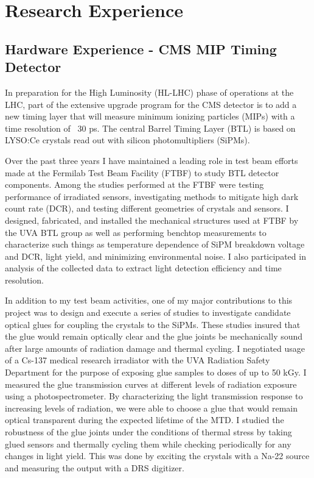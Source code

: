 \documentclass[a4paper]{article}
\begin{document}
\section{Research Experience}



\subsection{Hardware Experience - CMS MIP Timing Detector}
In preparation for the High Luminosity (HL-LHC) phase of operations at the LHC, part of the extensive upgrade program for the CMS detector is to add a new timing layer that will measure minimum ionizing particles (MIPs) with a time resolution of ~30 ps.  The central Barrel Timing Layer (BTL) is based on LYSO:Ce crystals read out with silicon photomultipliers (SiPMs).  

Over the past three years I have maintained a leading role in test beam efforts made at the Fermilab Test Beam Facility (FTBF) to study BTL detector components.  Among the studies performed at the FTBF were testing performance of irradiated sensors, investigating methods to mitigate high dark count rate (DCR), and testing different geometries of crystals and sensors.  I designed, fabricated, and installed the mechanical structures used at FTBF by the UVA BTL group as well as performing benchtop measurements to characterize such things as temperature dependence of SiPM breakdown voltage and DCR, light yield, and minimizing environmental noise.  I also participated in analysis of the collected data to extract light detection efficiency and time resolution.

In addition to my test beam activities, one of my major contributions to this project was to design and execute a series of studies to investigate candidate optical glues for coupling the crystals to the SiPMs.  These studies insured that the glue would remain optically clear and the glue joints be mechanically sound after large amounts of radiation damage and thermal cycling.  I negotiated usage of a Cs-137 medical research irradiator with the UVA Radiation Safety Department for the purpose of exposing glue samples to doses of up to 50 kGy.  I measured the glue transmission curves at different levels of radiation exposure using a photospectrometer.  By characterizing the light transmission response to increasing levels of radiation, we were able to choose a glue that would remain optical transparent during the expected lifetime of the MTD.  I studied the robustness of the glue joints under the conditions of thermal stress by taking glued sensors and thermally cycling them while checking periodically for any changes in light yield.  This was done by exciting the crystals with a Na-22 source and measuring the output with a DRS digitizer.
\end{document}
